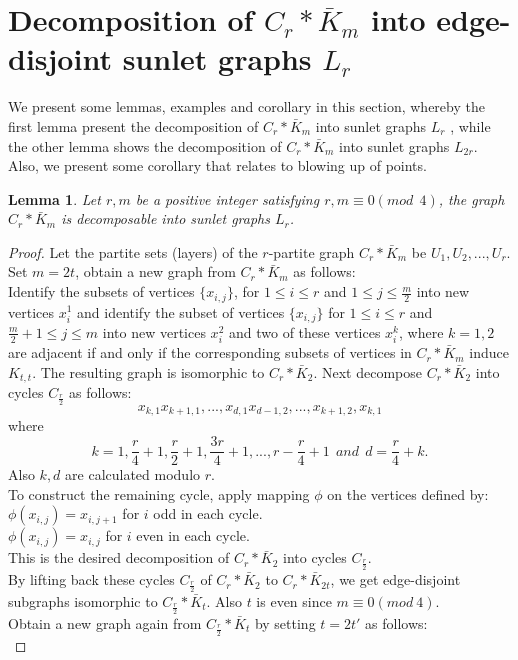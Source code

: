 \documentclass[12pt]{report}
\newtheorem{lem}[thm]{Lemma}
\begin{document}
\section{Decomposition of  $C_{r}*\bar{K}_{m}$ into edge-disjoint sunlet graphs $L_r$}
We present some lemmas, examples and corollary in this section, whereby the first lemma present the decomposition of $C_{r}*\bar{K}_{m}$ into sunlet graphs $L_r$ , while the other lemma shows the decomposition of $C_{r}*\bar{K}_{m}$ into sunlet graphs $L_{2r}$. Also, we present some corollary that relates to blowing up of points.
 \begin{lem}\label{L:R1}
 Let $r,m$ be a positive integer satisfying $r,m\equiv 0(mod \ \ 4)$, the graph $C_r*\bar{K}_m$ is decomposable into sunlet graphs $L_r$.
 \end{lem}
 \begin{proof}
 Let the partite sets (layers) of the $r$-partite graph $C_r*\bar{K}_m$ be $U_1,U_2,...,U_r$. Set $m=2t$, obtain a new graph from $C_r*\bar{K}_m$ as follows:\\
 Identify the subsets of vertices  $\{x_{i,j}\}$, for $1\leq i\leq r$ and $1\leq j\leq \frac{m}{2}$ into new vertices $x_i^1$ and identify the subset of vertices $\{x_{i,j}\}$  for $1\leq i\leq r$ and $\frac{m}{2}+1\leq j\leq m$ into new vertices $x_i^2$ and  two of these vertices $x_i^k$, where $k=1,2$ are adjacent if and only if the corresponding subsets of vertices in $C_r*\bar{K}_m$ induce $K_{t,t}$. The resulting graph is isomorphic to $C_r*\bar{K}_2$. Next decompose $C_r*\bar{K}_2$ into cycles $C_{\frac{r}{2}}$ as follows:
 $$x_{k,1}x_{k+1,1},...,x_{d,1}x_{d-1,2},...,x_{k+1,2},x_{k,1}$$
 where
 $$k=1,\frac{r}{4}+1,\frac{r}{2}+1,\frac{3r}{4}+1,...,r-\frac{r}{4}+1\ \ and\ \  d=\frac{r}{4}+k.$$ Also $k,d$ are calculated modulo $r$.\\
 To construct the remaining cycle, apply mapping $\phi$ on the vertices defined by:\\
 $\phi(x_{i,j})=x_{i,j+1}$ for $i$ odd  in each cycle.\\
 $\phi(x_{i,j})=x_{i,j}$ for $i$ even in each cycle.\\
 This is the desired decomposition of $C_r*\bar{K}_2$ into cycles $C_{\frac{r}{2}}$.\\
 By lifting back these cycles $C_\frac{r}{2}$ of $C_r*\bar{K}_2$ to $C_r*\bar{K}_{2t}$, we get edge-disjoint subgraphs isomorphic to $C_{\frac{r}{2}}*\bar{K}_t$. Also $t$ is even since $m\equiv 0(mod\ 4)$. \\
 Obtain a new graph again from $C_{\frac{r}{2}}*\bar{K}_t$ by setting $t=2t'$ as follows:\\

\end{proof}
\end{document}
